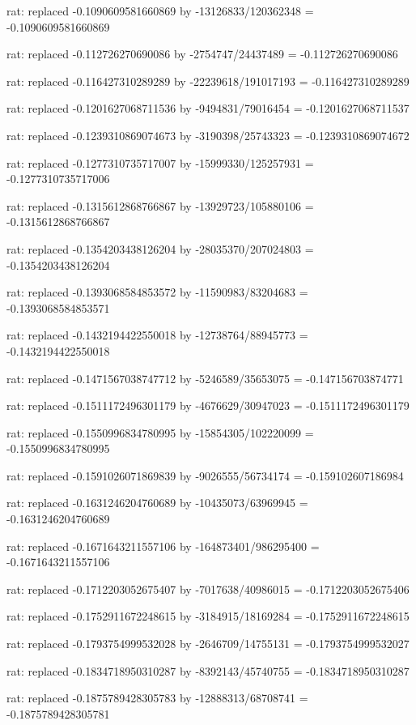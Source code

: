 \documentclass[a4paper,10pt]{article}
\begin{document}
\begin{eulernotebook}
\begin{eulercomment}
\begin{eulercomment}
\begin{eulercomment}
\begin{eulercomment}
\begin{eulercomment}
\begin{eulercomment}
\begin{eulercomment}
\begin{eulercomment}
\begin{eulercomment}
\begin{eulercomment}
\begin{eulercomment}
\begin{eulercomment}
\begin{eulercomment}
\begin{eulercomment}
\begin{eulercomment}
\begin{eulercomment}
\begin{euleroutput}
  rat: replaced -0.1090609581660869 by -13126833/120362348 = -0.1090609581660869
  
  rat: replaced -0.112726270690086 by -2754747/24437489 = -0.112726270690086
  
  rat: replaced -0.116427310289289 by -22239618/191017193 = -0.116427310289289
  
  rat: replaced -0.1201627068711536 by -9494831/79016454 = -0.1201627068711537
  
  rat: replaced -0.1239310869074673 by -3190398/25743323 = -0.1239310869074672
  
  rat: replaced -0.1277310735717007 by -15999330/125257931 = -0.1277310735717006
  
  rat: replaced -0.1315612868766867 by -13929723/105880106 = -0.1315612868766867
  
  rat: replaced -0.1354203438126204 by -28035370/207024803 = -0.1354203438126204
  
  rat: replaced -0.1393068584853572 by -11590983/83204683 = -0.1393068584853571
  
  rat: replaced -0.1432194422550018 by -12738764/88945773 = -0.1432194422550018
  
  rat: replaced -0.1471567038747712 by -5246589/35653075 = -0.147156703874771
  
  rat: replaced -0.1511172496301179 by -4676629/30947023 = -0.1511172496301179
  
  rat: replaced -0.1550996834780995 by -15854305/102220099 = -0.1550996834780995
  
  rat: replaced -0.1591026071869839 by -9026555/56734174 = -0.159102607186984
  
  rat: replaced -0.1631246204760689 by -10435073/63969945 = -0.1631246204760689
  
  rat: replaced -0.1671643211557106 by -164873401/986295400 = -0.1671643211557106
  
  rat: replaced -0.1712203052675407 by -7017638/40986015 = -0.1712203052675406
  
  rat: replaced -0.1752911672248615 by -3184915/18169284 = -0.1752911672248615
  
  rat: replaced -0.1793754999532028 by -2646709/14755131 = -0.1793754999532027
  
  rat: replaced -0.1834718950310287 by -8392143/45740755 = -0.1834718950310287
  
  rat: replaced -0.1875789428305783 by -12888313/68708741 = -0.1875789428305781
  

\end{euleroutput}
\end{eulercomment}
\end{eulercomment}
\end{eulercomment}
\end{eulercomment}
\end{eulercomment}
\end{eulercomment}
\end{eulercomment}
\end{eulercomment}
\end{eulercomment}
\end{eulercomment}
\end{eulercomment}
\end{eulercomment}
\end{eulercomment}
\end{eulercomment}
\end{eulercomment}
\end{eulercomment}
\end{eulernotebook}
\end{document}
